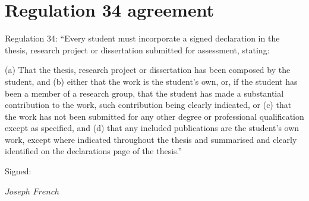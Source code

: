 \section{Regulation 34 agreement}

Regulation 34: “Every student must incorporate a signed declaration in the thesis, research project or dissertation submitted for assessment, stating:

(a) That the thesis, research project or dissertation has been composed by the student, and
(b) either that the work is the student’s own, or, if the student has been a member of a research group, that the student has made a substantial contribution to the work, such contribution being clearly indicated, or
(c) that the work has not been submitted for any other degree or professional qualification except as specified, and
(d) that any included publications are the student’s own work, except where indicated throughout the thesis and summarised and clearly identified on the declarations page of the thesis.”

Signed:

$Joseph$ $French$